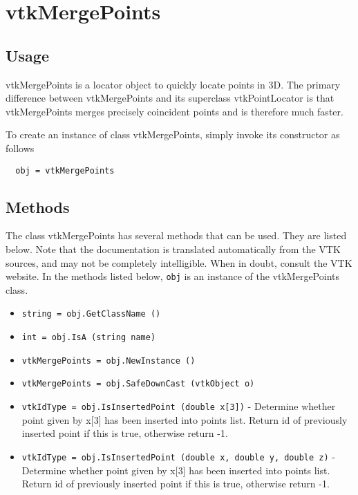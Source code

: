 \section{vtkMergePoints}

\subsection{Usage}

 vtkMergePoints is a locator object to quickly locate points in 3D.
 The primary difference between vtkMergePoints and its superclass
 vtkPointLocator is that vtkMergePoints merges precisely coincident points
 and is therefore much faster.

To create an instance of class vtkMergePoints, simply
invoke its constructor as follows
\begin{verbatim}
  obj = vtkMergePoints
\end{verbatim}
\subsection{Methods}

The class vtkMergePoints has several methods that can be used.
  They are listed below.
Note that the documentation is translated automatically from the VTK sources,
and may not be completely intelligible.  When in doubt, consult the VTK website.
In the methods listed below, \verb|obj| is an instance of the vtkMergePoints class.
\begin{itemize}
\item  \verb|string = obj.GetClassName ()|

\item  \verb|int = obj.IsA (string name)|

\item  \verb|vtkMergePoints = obj.NewInstance ()|

\item  \verb|vtkMergePoints = obj.SafeDownCast (vtkObject o)|

\item  \verb|vtkIdType = obj.IsInsertedPoint (double x[3])| -  Determine whether point given by x[3] has been inserted into points list.
 Return id of previously inserted point if this is true, otherwise return
 -1.

\item  \verb|vtkIdType = obj.IsInsertedPoint (double x, double y, double z)| -  Determine whether point given by x[3] has been inserted into points list.
 Return id of previously inserted point if this is true, otherwise return
 -1.

\end{itemize}
